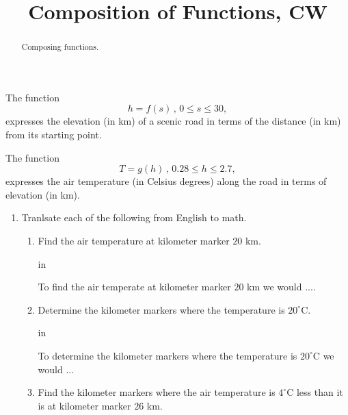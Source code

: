 \documentclass{ximera}
\title{Composition of Functions, CW}
\newcommand{\pskip}{\vskip 0.1 in}
\begin{document}
\begin{abstract}
Composing functions.
\end{abstract}
\maketitle


\begin{example} \label{f3fmmdf}
The function
\[
   h = f(s) \, , \, 0\leq s \leq 30 ,
\]
expresses the elevation (in km) of a scenic road in terms of the distance (in km) from its starting point.

The function
\[
 T = g(h) \, , \, 0.28 \leq h \leq 2.7 ,
\]
expresses the air temperature (in Celsius degrees) along the road in terms of elevation (in km).


\begin{enumerate}

\item Tranlsate each of the following from English to math. 

\begin{enumerate}
\item Find the air temperature at kilometer marker $20$ km.

\pskip

To find the air temperate at kilometer marker $20$ km we would ....

\item Determine the kilometer markers where the temperature is $20^\circ$C.

\pskip

To determine the kilometer markers where the temperature is $20^\circ$C we would ...

\item Find the kilometer markers where the air temperature is $4^\circ$C less than it is at kilometer marker $26$ km.





\end{enumerate}





\end{enumerate}
\end{example}
\end{document}
